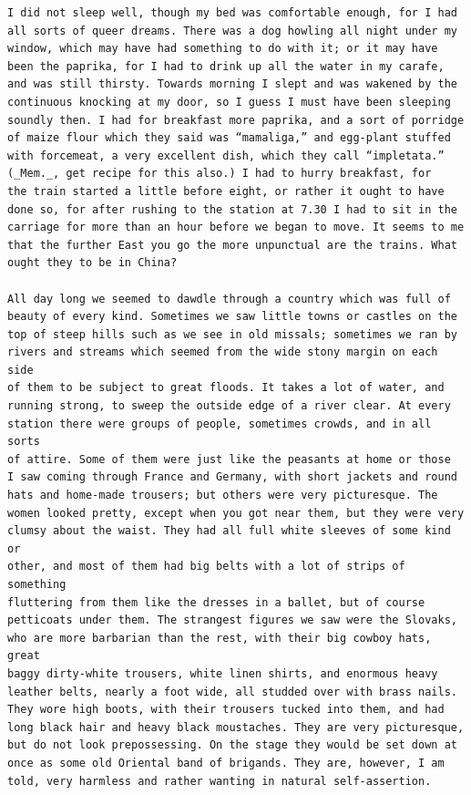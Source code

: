 \documentclass{article}
\begin{document}
\begin{verbatim}
I did not sleep well, though my bed was comfortable enough, for I had
all sorts of queer dreams. There was a dog howling all night under my
window, which may have had something to do with it; or it may have
been the paprika, for I had to drink up all the water in my carafe,
and was still thirsty. Towards morning I slept and was wakened by the
continuous knocking at my door, so I guess I must have been sleeping
soundly then. I had for breakfast more paprika, and a sort of porridge
of maize flour which they said was “mamaliga,” and egg-plant stuffed
with forcemeat, a very excellent dish, which they call “impletata.”
(_Mem._, get recipe for this also.) I had to hurry breakfast, for
the train started a little before eight, or rather it ought to have
done so, for after rushing to the station at 7.30 I had to sit in the
carriage for more than an hour before we began to move. It seems to me
that the further East you go the more unpunctual are the trains. What
ought they to be in China?

All day long we seemed to dawdle through a country which was full of
beauty of every kind. Sometimes we saw little towns or castles on the
top of steep hills such as we see in old missals; sometimes we ran by
rivers and streams which seemed from the wide stony margin on each side
of them to be subject to great floods. It takes a lot of water, and
running strong, to sweep the outside edge of a river clear. At every
station there were groups of people, sometimes crowds, and in all sorts
of attire. Some of them were just like the peasants at home or those
I saw coming through France and Germany, with short jackets and round
hats and home-made trousers; but others were very picturesque. The
women looked pretty, except when you got near them, but they were very
clumsy about the waist. They had all full white sleeves of some kind or
other, and most of them had big belts with a lot of strips of something
fluttering from them like the dresses in a ballet, but of course
petticoats under them. The strangest figures we saw were the Slovaks,
who are more barbarian than the rest, with their big cowboy hats, great
baggy dirty-white trousers, white linen shirts, and enormous heavy
leather belts, nearly a foot wide, all studded over with brass nails.
They wore high boots, with their trousers tucked into them, and had
long black hair and heavy black moustaches. They are very picturesque,
but do not look prepossessing. On the stage they would be set down at
once as some old Oriental band of brigands. They are, however, I am
told, very harmless and rather wanting in natural self-assertion.


\end{verbatim}
\end{document}
